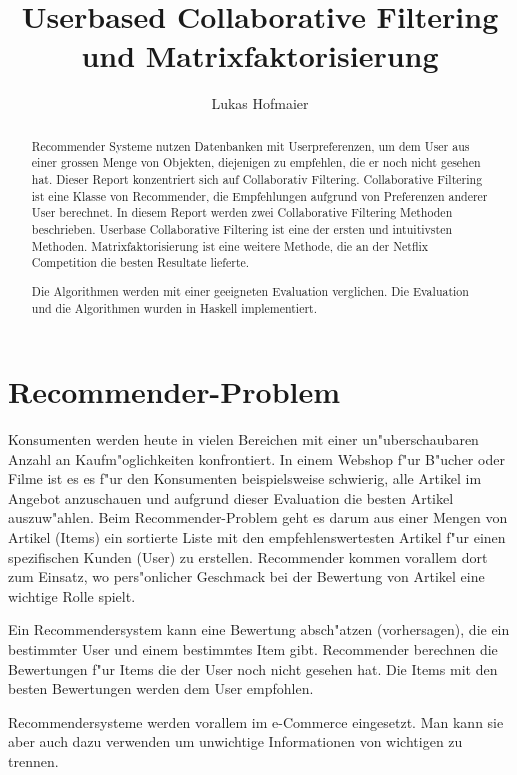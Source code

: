 \documentclass[a4paper, 12pt]{article}
\author{Lukas Hofmaier}
\title{Userbased Collaborative Filtering und Matrixfaktorisierung}
\begin{document}
\lstset{basicstyle=\small,
language=Haskell,
stringstyle=ttfamiliy
}

\maketitle
\newpage
\tableofcontents
\newpage
\begin{abstract}
  Recommender Systeme nutzen Datenbanken mit Userpreferenzen, um dem User aus einer grossen Menge von Objekten, diejenigen zu empfehlen, die er noch nicht gesehen hat. Dieser Report konzentriert sich auf Collaborativ Filtering. Collaborative Filtering ist eine Klasse von Recommender, die Empfehlungen aufgrund von Preferenzen anderer User berechnet.
In diesem Report werden zwei Collaborative Filtering Methoden beschrieben. Userbase Collaborative Filtering ist eine der ersten und intuitivsten Methoden. Matrixfaktorisierung ist eine weitere Methode, die an der Netflix Competition die besten Resultate lieferte.

Die Algorithmen werden mit einer geeigneten Evaluation verglichen. Die Evaluation und die Algorithmen wurden in Haskell implementiert.

\end{abstract}

\section{Recommender-Problem}
\label{sec:problem}

Konsumenten werden heute in vielen Bereichen mit einer un"uberschaubaren Anzahl an Kaufm"oglichkeiten konfrontiert. In einem Webshop f"ur B"ucher oder Filme ist es es f"ur den Konsumenten beispielsweise schwierig, alle Artikel im Angebot anzuschauen und aufgrund dieser Evaluation die besten Artikel auszuw"ahlen. Beim Recommender-Problem geht es darum aus einer Mengen von Artikel (Items) ein sortierte Liste mit den empfehlenswertesten Artikel f"ur einen spezifischen Kunden (User) zu erstellen. Recommender kommen vorallem dort zum Einsatz, wo pers"onlicher Geschmack bei der Bewertung von Artikel eine wichtige Rolle spielt.

Ein Recommendersystem kann eine Bewertung absch"atzen (vorhersagen), die ein bestimmter User und einem bestimmtes Item gibt. Recommender berechnen die Bewertungen f"ur Items die der User noch nicht gesehen hat. Die Items mit den besten Bewertungen werden dem User empfohlen.

Recommendersysteme werden vorallem im e-Commerce eingesetzt. Man kann sie aber auch dazu verwenden um unwichtige Informationen von wichtigen zu trennen.
\end{document}
